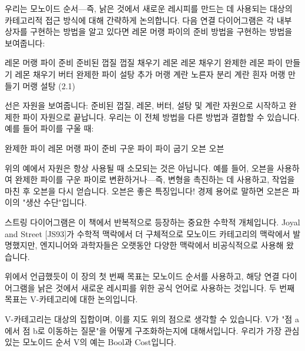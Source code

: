 \documentclass[11pt, a4paper, twoside, openany]{book}
\begin{document}
\par\medskip
우리는 모노이드 순서—즉, 낡은 것에서 새로운 레시피를 만드는 데 사용되는 대상의 카테고리적 접근 방식에 대해 간략하게 논의합니다. 다음 연결 다이어그램은 각 내부 상자를 구현하는 방법을 알고 있다면 레몬 머랭 파이의 준비 방법을 구현하는 방법을 보여줍니다:

\par\medskip
레몬 머랭 파이 준비
준비된 껍질
껍질 채우기
레몬
레몬
채우기
완제한
레몬 파이
만들기
레몬
채우기
버터
완제한
파이
설탕 추가
머랭
계란 노른자 분리
계란
흰자
머랭 만들기
머랭
설탕
(2.1)

\par\medskip
선은 자원을 보여줍니다: 준비된 껍질, 레몬, 버터, 설탕 및 계란 자원으로 시작하고 완제한 파이 자원으로 끝납니다. 우리는 이 전체 방법을 다른 방법과 결합할 수 있습니다. 예를 들어 파이를 구울 때:

\par\medskip
완제한
파이
레몬 머랭 파이 준비
구운 파이
파이 굽기
오븐
오븐

\par\medskip
위의 예에서 자원은 항상 사용될 때 소모되는 것은 아닙니다. 예를 들어, 오븐을 사용하여 완제한 파이를 구운 파이로 변환하거나—즉, 변형을 촉진하는 데 사용하고, 작업을 마친 후 오븐을 다시 얻습니다. 오븐은 좋은 특징입니다! 경제 용어로 말하면 오븐은 파이의 "생산 수단"입니다.

\par\medskip
스트링 다이어그램은 이 책에서 반복적으로 등장하는 중요한 수학적 개체입니다. Joyal and Street [JS93]가 수학적 맥락에서 더 구체적으로 모노이드 카테고리의 맥락에서 발명했지만, 엔지니어와 과학자들은 오랫동안 다양한 맥락에서 비공식적으로 사용해 왔습니다.

\par\medskip
위에서 언급했듯이 이 장의 첫 번째 목표는 모노이드 순서를 사용하고, 해당 연결 다이어그램을 낡은 것에서 새로운 레시피를 위한 공식 언어로 사용하는 것입니다. 두 번째 목표는 V-카테고리에 대한 논의입니다.

\par\medskip
V-카테고리는 대상의 집합이며, 이를 지도 위의 점으로 생각할 수 있습니다. V\hspace{0pt}가 "점 a\hspace{0pt}에서 점 b\hspace{0pt}로 이동하는 질문"을 어떻게 구조화하는지에 대해서입니다. 우리가 가장 관심 있는 모노이드 순서 V\hspace{0pt}의 예는 Bool\hspace{0pt}과 Cost\hspace{0pt}입니다.
\end{document}
